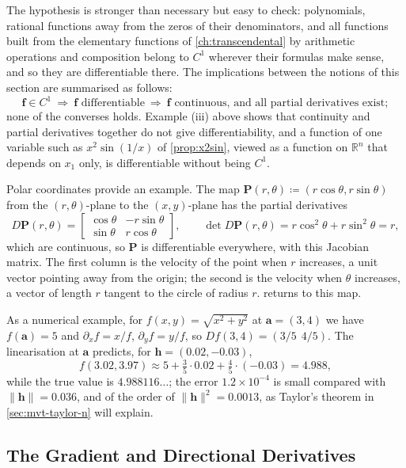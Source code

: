 The hypothesis is stronger than necessary but easy to check: polynomials, rational functions away from the zeros of their denominators, and all functions built from the elementary functions of \cref{ch:transcendental} by arithmetic operations and composition belong to $C^1$ wherever their formulas make sense, and so they are differentiable there. The implications between the notions of this section are summarised as follows:
\[
\mathbf f\in C^1\ \Longrightarrow\ \mathbf f\text{ differentiable}\ \Longrightarrow\ \mathbf f\text{ continuous, and all partial derivatives exist};
\]
none of the converses holds. Example (iii) above shows that continuity and partial derivatives together do not give differentiability, and a function of one variable such as $x^2\sin(1/x)$ of \cref{prop:x2sin}, viewed as a function on $\mathbb R^n$ that depends on $x_1$ only, is differentiable without being $C^1$.

Polar coordinates provide an example. The map $\mathbf P(r,\theta)\coloneqq(r\cos\theta,r\sin\theta)$ from the $(r,\theta)$-plane to the $(x,y)$-plane has the partial derivatives
\[
D\mathbf P(r,\theta)=\begin{bmatrix}\cos\theta&-r\sin\theta\\\sin\theta&r\cos\theta\end{bmatrix},\qquad\det D\mathbf P(r,\theta)=r\cos^2\theta+r\sin^2\theta=r ,
\]
which are continuous, so $\mathbf P$ is differentiable everywhere, with this Jacobian matrix. The first column is the velocity of the point when $r$ increases, a unit vector pointing away from the origin; the second is the velocity when $\theta$ increases, a vector of length $r$ tangent to the circle of radius $r$.  returns to this map.

As a numerical example, for $f(x,y)=\sqrt{x^2+y^2}$ at $\mathbf a=(3,4)$ we have $f(\mathbf a)=5$ and $\partial_xf=x/f$, $\partial_yf=y/f$, so $Df(3,4)=(3/5\ \ 4/5)$. The linearisation at $\mathbf a$ predicts, for $\mathbf h=(0.02,-0.03)$,
\[
f(3.02,3.97)\approx5+\tfrac35\cdot0.02+\tfrac45\cdot(-0.03)=4.988 ,
\]
while the true value is $4.988116\ldots$; the error $1.2\times10^{-4}$ is small compared with $\|\mathbf h\|=0.036$, and of the order of $\|\mathbf h\|^2=0.0013$, as Taylor's theorem in \cref{sec:mvt-taylor-n} will explain.

\subsection{The Gradient and Directional Derivatives}

